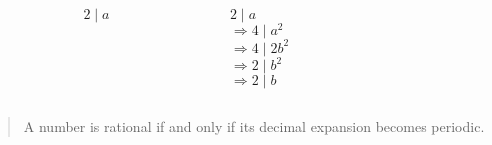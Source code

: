 \documentclass{beamer}
\begin{document}
\begin{frame}
  \begin{columns}
    \begin{column}{0.3\textwidth}
      \color{gmitblue} \fontsize{30}{10}
      \[2 \mid a\]
    \end{column}
    {\color{gmitgrey!30}\vrule{}} \hspace{0.1\textwidth}
    \begin{column}{0.5\textwidth}
      $2 \mid a$ \\[8mm]
      $\Rightarrow 4 \mid a^2$ \\[8mm]
      $\Rightarrow 4 \mid 2b^2$ \\[8mm]
      $\Rightarrow 2 \mid b^2$ \\[8mm]
      $\Rightarrow 2 \mid b$
    \end{column}
  \end{columns}
\end{frame}


\begin{frame}[standout]
  \begin{quote}
    A number is rational if and only if its decimal expansion becomes periodic.
  \end{quote}
\end{frame}
\end{document}
